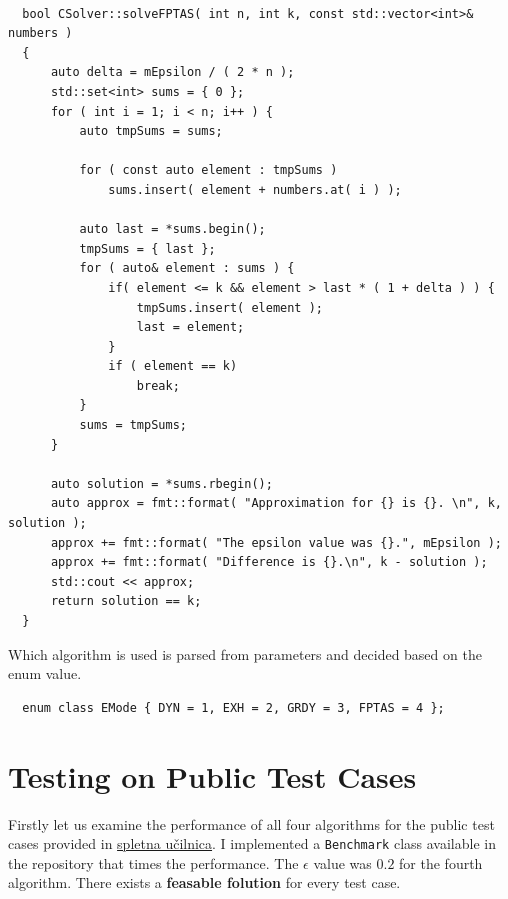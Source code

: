 \documentclass[11pt]{article}
\begin{document}
\begin{verbatim}

  bool CSolver::solveFPTAS( int n, int k, const std::vector<int>& numbers )
  {
      auto delta = mEpsilon / ( 2 * n );
      std::set<int> sums = { 0 };
      for ( int i = 1; i < n; i++ ) {
          auto tmpSums = sums;
  
          for ( const auto element : tmpSums ) 
              sums.insert( element + numbers.at( i ) );
  
          auto last = *sums.begin();
          tmpSums = { last };
          for ( auto& element : sums ) {
              if( element <= k && element > last * ( 1 + delta ) ) {
                  tmpSums.insert( element );
                  last = element;
              }
              if ( element == k)
                  break;
          }
          sums = tmpSums;
      }
  
      auto solution = *sums.rbegin();
      auto approx = fmt::format( "Approximation for {} is {}. \n", k, solution );
      approx += fmt::format( "The epsilon value was {}.", mEpsilon );
      approx += fmt::format( "Difference is {}.\n", k - solution );
      std::cout << approx;
      return solution == k;
  }  
\end{verbatim}

Which algorithm is used is parsed from parameters and decided based on the enum value.

\begin{verbatim}
  enum class EMode { DYN = 1, EXH = 2, GRDY = 3, FPTAS = 4 };
\end{verbatim}

\pagebreak

\section{Testing on Public Test Cases}

Firstly let us examine the performance of all four algorithms for the public test cases provided in \href{https://ucilnica.fri.uni-lj.si/mod/assign/view.php?id=32883}{spletna učilnica}. I implemented a \texttt{Benchmark} class available in the repository that times the performance. The $\epsilon$ value was $0.2$ for the fourth algorithm. There exists a \textbf{feasable folution} for every test case. 
\end{document}
